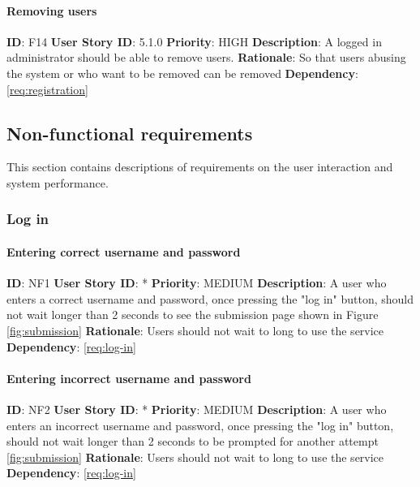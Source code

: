 \documentclass{article}
\begin{document}
\paragraph{Removing users}\label{req:removingUser}
\textbf{ID}: F14\newline
\textbf{User Story ID}: 5.1.0\newline
\textbf{Priority}: HIGH\newline
\textbf{Description}: A logged in administrator should be able to remove users. \newline
\textbf{Rationale}: So that users abusing the system or who want to be removed can be removed\newline
\textbf{Dependency}: \ref{req:registration}\newline


\subsection{Non-functional requirements}
This section contains descriptions of requirements on the user interaction and system performance.


\subsubsection{Log in}

\paragraph{Entering correct username and password}\label{req:}
\textbf{ID}: NF1\newline
\textbf{User Story ID}: *\newline
\textbf{Priority}: MEDIUM\newline
\textbf{Description}: A user who enters a correct username and password, once pressing the "log in" button, should not wait longer than 2 seconds to see the submission page shown in Figure \ref{fig:submission}\newline
\textbf{Rationale}: Users should not wait to long to use the service\newline
\textbf{Dependency}: \ref{req:log-in} \newline

\paragraph{Entering incorrect username and password}\label{req:}
\textbf{ID}: NF2\newline
\textbf{User Story ID}: *\newline
\textbf{Priority}: MEDIUM\newline
\textbf{Description}: A user who enters an incorrect username and password, once pressing the "log in" button, should not wait longer than 2 seconds to be prompted for another attempt \ref{fig:submission}\newline
\textbf{Rationale}: Users should not wait to long to use the service\newline
\textbf{Dependency}: \ref{req:log-in} \newline
\end{document}
